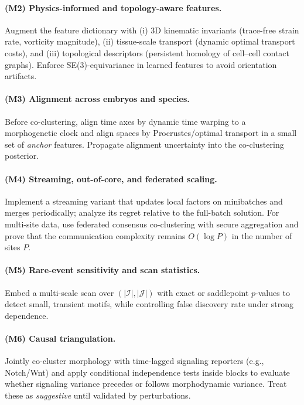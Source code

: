 \documentclass[unnumsec,webpdf,modern,large,namedate]{oup-authoring-template}%
\theoremstyle{thmstyleone}\newtheorem{theorem}{Theorem}
\theoremstyle{thmstyletwo}\newtheorem{example}{Example}
\theoremstyle{thmstylethree}\newtheorem{definition}{Definition}
\begin{document}
\paragraph{(M2) Physics-informed and topology-aware features.}
Augment the feature dictionary with (i) 3D kinematic invariants (trace-free strain rate,
vorticity magnitude), (ii) tissue-scale transport (dynamic optimal transport costs), and
(iii) topological descriptors (persistent homology of cell–cell contact graphs).  Enforce
SE(3)-equivariance in learned features to avoid orientation artifacts.

\paragraph{(M3) Alignment across embryos and species.}
Before co-clustering, align time axes by dynamic time warping to a morphogenetic clock
and align spaces by Procrustes/optimal transport in a small set of \emph{anchor}
features.  Propagate alignment uncertainty into the co-clustering posterior.

\paragraph{(M4) Streaming, out-of-core, and federated scaling.}
Implement a streaming variant that updates local factors on minibatches and merges
periodically; analyze its regret relative to the full-batch solution.  For multi-site
data, use federated consensus co-clustering with secure aggregation and prove that the
communication complexity remains $O(\log P)$ in the number of sites $P$.

\paragraph{(M5) Rare-event sensitivity and scan statistics.}
Embed a multi-scale scan over $(|\mathcal{I}|,|\mathcal{J}|)$ with exact or saddlepoint
$p$-values to detect small, transient motifs, while controlling false discovery rate under
strong dependence.

\paragraph{(M6) Causal triangulation.}
Jointly co-cluster morphology with time-lagged signaling reporters (e.g., Notch/Wnt)
and apply conditional independence tests inside blocks to evaluate whether signaling
variance precedes or follows morphodynamic variance.  Treat these as \emph{suggestive}
until validated by perturbations.
\end{document}
